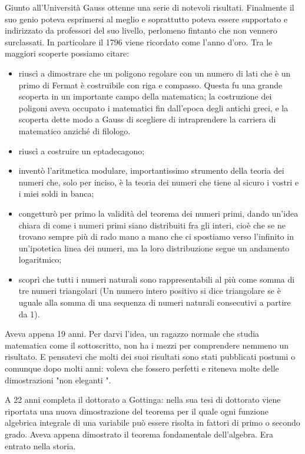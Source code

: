 Giunto all'Università Gauss ottenne una serie di notevoli risultati. Finalmente il suo genio poteva esprimersi al meglio e soprattutto poteva essere supportato e indirizzato da professori del suo livello, perlomeno fintanto che non vennero surclassati. In particolare il 1796 viene ricordato come l'anno d'oro. 
Tra le maggiori scoperte possiamo citare:
\begin{itemize}
	\item riuscì a dimostrare che un poligono regolare con un numero di lati che è un primo di Fermat è costruibile con riga e compasso. Questa fu una grande scoperta in un importante campo della matematica; la costruzione dei poligoni aveva occupato i matematici fin dall'epoca degli antichi greci, e la scoperta dette modo a Gauss di scegliere di intraprendere la carriera di matematico anziché di filologo.
	\item riuscì a costruire un eptadecagono;
	\item inventò l'aritmetica modulare, importantissimo strumento della teoria dei numeri che, solo per inciso, è la teoria dei numeri che tiene al sicuro i vostri e i miei soldi in banca;
	\item congetturò per primo la validità del teorema dei numeri primi, dando un'idea chiara di come i numeri primi siano distribuiti fra gli interi, cioè che se ne trovano sempre più di rado mano a mano che ci spostiamo verso l'infinito in un'ipotetica linea dei numeri, ma la loro distribuzione segue un andamento logaritmico;
	\item scoprì che tutti i numeri naturali sono rappresentabili al più come somma di tre numeri triangolari (Un numero intero positivo si dice triangolare se è uguale alla somma di una sequenza di numeri naturali consecutivi a partire da 1).
\end{itemize}

Aveva appena 19 anni. Per darvi l'idea, un ragazzo normale che studia matematica come il sottoscritto, non ha i mezzi per comprendere nemmeno un risultato. E pensatevi che molti dei suoi risultati sono stati pubblicati postumi o comunque dopo molti anni: voleva che fossero perfetti e riteneva molte delle dimostrazioni "non eleganti ".

A 22 anni completa il dottorato a Gottinga: nella sua tesi di dottorato viene riportata una nuova dimostrazione del teorema per il quale ogni funzione algebrica integrale di una variabile può essere risolta in fattori di primo o secondo grado. Aveva appena dimostrato il teorema fondamentale dell'algebra. Era entrato nella storia.

